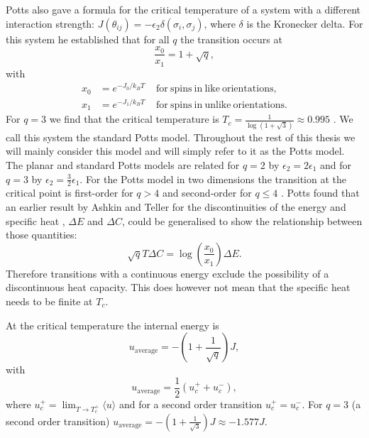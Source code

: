 \documentclass[11pt, a4paper]{report} %
\begin{document}
Potts also gave a formula for the critical temperature of a system with a different interaction strength: \(J(\theta_{ij}) = -\epsilon_2 \delta(\sigma_i, \sigma_j)\), where \(\delta\) is the Kronecker delta.
For this system he established that for all \(q\) the transition occurs at \cite{potts:1952}
\begin{equation}
	\frac{x_0}{x_1} = 1 + \sqrt{q},
\end{equation}
with
\begin{align}
	x_0 &= e^{-J_0 / k_B T} \mathrm{\ \ \ \ \ for\ spins\ in\ like\ orientations,}\\
	x_1 & = e^{-J_1 / k_B T} \mathrm{\ \ \ \ \ for\ spins\ in\ unlike\ orientations}.
\end{align}
For \(q=3\) we find that the critical temperature is \(T_c=\frac{1}{\log(1+\sqrt{3})} \approx 0.995\) \cite{fan:2007}.
We call this system the standard Potts model.
Throughout the rest of this thesis we will mainly consider this model and will simply refer to it as the Potts model.
The planar and standard Potts models are related for \(q = 2\) by \(\epsilon_2 = 2 \epsilon_1\) and for \(q=3\) by \(\epsilon_2 = \frac{3}{2} \epsilon_1\).
For the Potts model in two dimensions the transition at the critical point is first-order for \(q > 4\) and second-order for \(q \leq 4\) \cite{wu:1982,baxter:1973}.
Potts found that an earlier result by Ashkin and Teller for the discontinuities of the energy and specific heat \cite{ashkin:1943}, \(\Delta E\) and \(\Delta C\), could be generalised to show the relationship between those quantities:
\begin{equation}
	\sqrt{q}T \Delta C = \log(\frac{x_0}{x_1}) \Delta E.
\end{equation}
Therefore transitions with a continuous energy exclude the possibility of a discontinuous heat capacity.
This does however not mean that the specific heat needs to be finite at \(T_c\).


At the critical temperature the internal energy is \cite{baxter:1989,binder:1981a}
\begin{equation}
	u_{\mathrm{average}} = -\left(1+\frac{1}{\sqrt{q}}\right)J,
\end{equation}
with
\begin{equation}
	u_{\mathrm{average}} = \frac{1}{2} (u_c^+ + u_c^-),
\end{equation}
where \(u_c^+ = \lim_{T \to T_c^+} \langle u \rangle\) and for a second order transition \(u_c^+ = u_c^-\).
For \(q=3\) (a second order transition) \(u_{\mathrm{average}} = -(1+\frac{1}{\sqrt{3}})J \approx - 1.577 J\).
\end{document}
